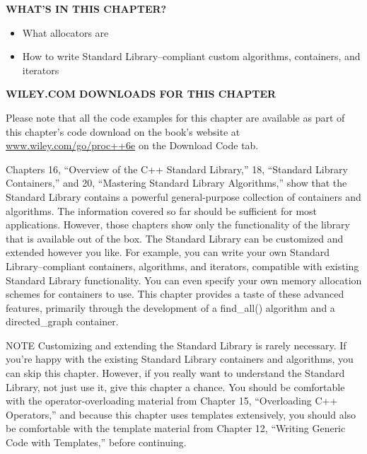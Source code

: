 \noindent
\textbf{WHAT’S IN THIS CHAPTER?}

\begin{itemize}
\item
What allocators are

\item
How to write Standard Library–compliant custom algorithms, containers, and iterators
\end{itemize}

\noindent
\textbf{WILEY.COM DOWNLOADS FOR THIS CHAPTER}

Please note that all the code examples for this chapter are available as part of this chapter’s code download on the book’s website at \url{www.wiley.com/go/proc++6e} on the Download Code tab.

Chapters 16, “Overview of the C++ Standard Library,” 18, “Standard Library Containers,” and 20, “Mastering Standard Library Algorithms,” show that the Standard Library contains a powerful general-purpose collection of containers and algorithms. The information covered so far should be sufficient for most applications. However, those chapters show only the functionality of the library that is available out of the box. The Standard Library can be customized and extended however you like. For example, you can write your own Standard Library–compliant containers, algorithms, and iterators, compatible with existing Standard Library functionality. You can even specify your own memory allocation schemes for containers to use. This chapter provides a taste of these advanced features, primarily through the development of a find\_all() algorithm and a directed\_graph container.

\begin{myNotic}{NOTE}
Customizing and extending the Standard Library is rarely necessary. If you’re happy with the existing Standard Library containers and algorithms, you can skip this chapter. However, if you really want to understand the Standard Library, not just use it, give this chapter a chance. You should be comfortable with the operator-overloading material from Chapter 15, “Overloading C++ Operators,” and because this chapter uses templates extensively, you should also be comfortable with the template material from Chapter 12, “Writing Generic Code with Templates,” before continuing.
\end{myNotic}


